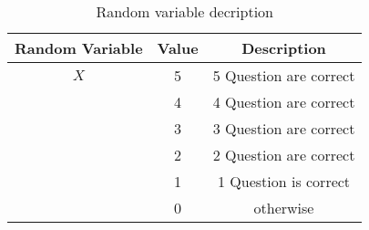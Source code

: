 \begin{table}[H]
\centering
\def\arraystretch{1.5}
\begin{tabular}{|c|c|c|}
\hline
\textbf{Random Variable} & \textbf{Value} & \textbf{Description} \\ \hline 
$X$ & 5 & 5 Question are correct \\ \hhline{~--}
& 4 & 4 Question are correct \\ \hhline{~--}
& 3 & 3 Question are correct \\ \hhline{~--}
& 2 & 2 Question are correct \\ \hhline{~--}
& 1 & 1 Question is correct \\ \hhline{~--}
& 0 & otherwise \\ \hline
\end{tabular}
\label{tab: table 1}
\caption{Random variable decription}
\end{table}

